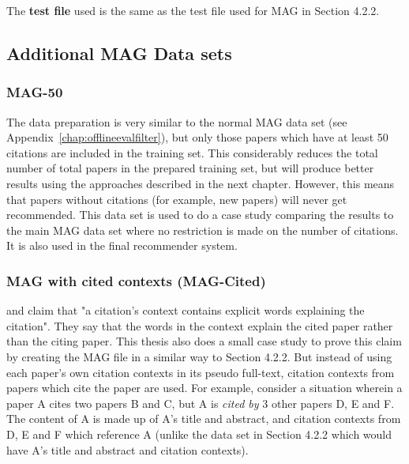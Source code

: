 The \textbf{test file} used is the same as the test file used for MAG in Section 4.2.2.

\subsection{Additional MAG Data sets}

\subsubsection{MAG-50}
The data preparation is very similar to the normal MAG data set (see Appendix~\ref{chap:offlineevalfilter}), but only those papers which have at least 50 citations are included in the training set. This considerably reduces the total number of total papers in the prepared training set, but will produce better results using the approaches described in the next chapter. However, this means that papers without citations (for example, new papers) will never get recommended. This data set is used to do a case study comparing the results to the main MAG data set where no restriction is made on the number of citations. It is also used in the final recommender system.

\subsubsection{MAG with cited contexts (MAG-Cited)}
\cite{HuangKCMGR12} and \cite{Huang2015} claim that "a citation’s context contains explicit words explaining the citation". They say that the words in the context explain the cited paper rather than the citing paper. This thesis also does a small case study to prove this claim by creating the MAG file in a similar way to Section 4.2.2. But instead of using each paper's own citation contexts in its pseudo full-text, citation contexts from papers which cite the paper are used. For example, consider a situation wherein a paper A cites two papers B and C, but A is \textit{cited by} 3 other papers D, E and F. The content of A is made up of A's title and abstract, and citation contexts from D, E and F which reference A (unlike the data set in Section 4.2.2 which would have A's title and abstract and citation contexts).